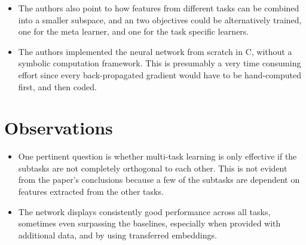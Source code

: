 \documentclass[12pt]{article}
\begin{document}
\begin{itemize}
    \item The authors also point to how features from different tasks can be combined into a smaller subspace, and an two objectives could be alternatively trained, one for the meta learner, and one for the task specific learners.
    \item The authors implemented the neural network from scratch in C, without a symbolic computation framework. This is presumably a very time consuming effort since every back-propagated gradient would have to be hand-computed first, and then coded.         
  \end{itemize}

\section{Observations}
  \begin{itemize}
    \item One pertinent question is whether multi-task learning is only effective if the subtasks are not completely orthogonal to each other. This is not evident from the paper's conclusions because a few of the subtasks are dependent on features extracted from the other tasks.
    \item The network displays consistently good performance across all tasks, sometimes even surpassing the baselines, especially when provided with additional data, and by using transferred embeddings.
  \end{itemize}
\end{document}
